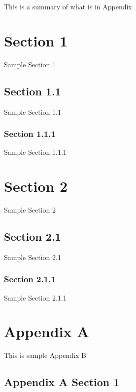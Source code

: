 \documentclass[
  letterpaper,
  DIV=11,
  numbers=noendperiod]{scrreprt}
\begin{document}

This is a summary of what is in Appendix


\chapter{Section 1}\label{section-1-1}

Sample Section 1

\section{Section 1.1}\label{section-1.1}

Sample Section 1.1

\subsection{Section 1.1.1}\label{section-1.1.1}

Sample Section 1.1.1


\chapter{Section 2}\label{section-2-1}

Sample Section 2

\section{Section 2.1}\label{section-2.1}

Sample Section 2.1

\subsection{Section 2.1.1}\label{section-2.1.1}

Sample Section 2.1.1

\cleardoublepage
{}
{}
\appendix

\chapter{Appendix A}\label{appendix-a-1}

This is sample Appendix B

\section{Appendix A Section 1}\label{appendix-a-section-1}
\end{document}
